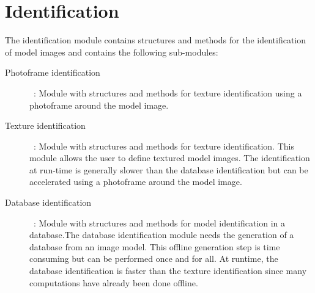 \section{Identification}
\label{sec:ident}

The identification module contains structures and methods for the identification of model images and contains the following sub-modules:

\begin{description}

\item[Photoframe identification]~: Module with structures and methods for texture identification using a photoframe around the model image.
\item[Texture identification]~: Module with structures and methods for texture identification. This module allows the user to define textured model images. The identification at run-time is generally slower than the database identification but can be accelerated using a photoframe around the model image.
\item[Database identification]~: Module with structures and methods for model identification in a database.The database identification module needs the generation of a database from an image model. This offline generation step is time consuming but can be performed once and for all. At runtime, the database identification is faster than the texture identification since many computations have already been done offline.
\end{description}




%
